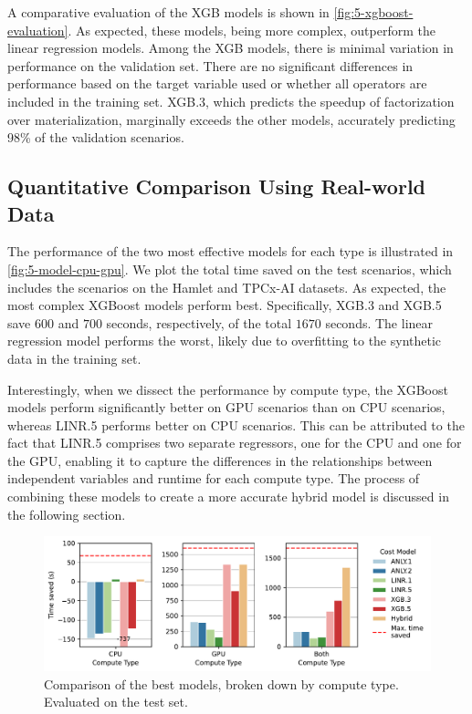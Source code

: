 A comparative evaluation of the XGB models is shown in \autoref{fig:5-xgboost-evaluation}. As expected, these models, being more complex, outperform the linear regression models. Among the XGB models, there is minimal variation in performance on the validation set. There are no significant differences in performance based on the target variable used or whether all operators are included in the training set. XGB.3, which predicts the speedup of factorization over materialization, marginally exceeds the other models, accurately predicting 98\% of the validation scenarios.

\subsection{Quantitative Comparison Using Real-world Data}
\label{subsec:5-comparing-performance}
The performance of the two most effective models for each type is illustrated in \autoref{fig:5-model-cpu-gpu}. We plot the total time saved on the test scenarios, which includes the scenarios on the Hamlet and TPCx-AI datasets. As expected, the most complex XGBoost models perform best. Specifically, XGB.3 and XGB.5 save $600$ and $700$ seconds, respectively, of the total $1670$ seconds. The linear regression model performs the worst, likely due to overfitting to the synthetic data in the training set.

Interestingly, when we dissect the performance by compute type, the XGBoost models perform significantly better on GPU scenarios than on CPU scenarios, whereas LINR.5 performs better on CPU scenarios. This can be attributed to the fact that LINR.5 comprises two separate regressors, one for the CPU and one for the GPU, enabling it to capture the differences in the relationships between independent variables and runtime for each compute type. The process of combining these models to create a more accurate hybrid model is discussed in the following section.

\begin{figure}[ht]
  \centering
  \includegraphics[width=0.9\linewidth]{chapters/05_cost_estimation/figures/compare_gpu_vs_cpu.pdf}
  \caption[Cost Model Comparison Broken Down by Compute Type]{Comparison of the best models, broken down by compute type. Evaluated on the test set.}
  \label{fig:5-model-cpu-gpu}
\end{figure}

